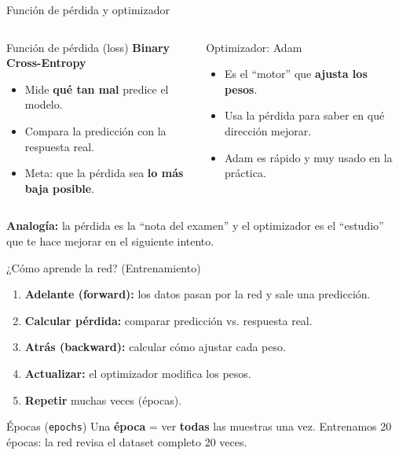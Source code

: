 \documentclass[10pt,aspectratio=169]{beamer}
\begin{document}
\begin{frame}{Función de pérdida y optimizador}
  \begin{columns}
    \begin{block}{Función de pérdida (loss)}
      \textbf{Binary Cross-Entropy}
      \begin{itemize}
        \item Mide \textbf{qué tan mal} predice el modelo.
        \item Compara la predicción con la respuesta real.
        \item Meta: que la pérdida sea \textbf{lo más baja posible}.
      \end{itemize}
    \end{block}

    \begin{block}{Optimizador: Adam}
      \begin{itemize}
        \item Es el ``motor'' que \textbf{ajusta los pesos}.
        \item Usa la pérdida para saber en qué dirección mejorar.
        \item Adam es rápido y muy usado en la práctica.
      \end{itemize}
    \end{block}
  \end{columns}

  \pause
  \begin{center}
    \small \textbf{Analogía:} la pérdida es la ``nota del examen'' y el
    optimizador es el ``estudio'' que te hace mejorar en el siguiente intento.
  \end{center}
\end{frame}

\begin{frame}{¿Cómo aprende la red? (Entrenamiento)}
  \begin{enumerate}
    \item \textbf{Adelante (forward):} los datos pasan por la red y sale una predicción.
    \item \textbf{Calcular pérdida:} comparar predicción vs. respuesta real.
    \item \textbf{Atrás (backward):} calcular cómo ajustar cada peso.
    \item \textbf{Actualizar:} el optimizador modifica los pesos.
    \item \textbf{Repetir} muchas veces (épocas).
  \end{enumerate}

  \pause
  \begin{block}{Épocas (\texttt{epochs})}
    Una \textbf{época} = ver \textbf{todas} las muestras una vez.
    Entrenamos 20 épocas: la red revisa el dataset completo 20 veces.
  \end{block}
\end{frame}
\end{document}
